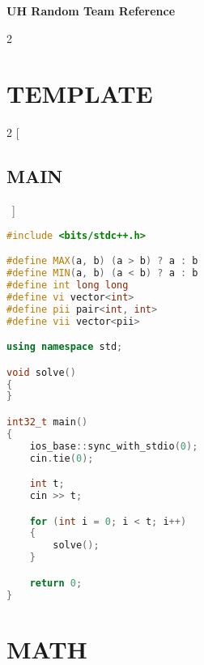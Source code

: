 \documentclass[leter]{amsart}
\begin{document}
\begin{center} \textbf{ UH Random Team Reference } \end{center} \vspace*{50pt} %

\begin{multicols}{2} \tableofcontents \end{multicols}

\enlargethispage*{\baselineskip} \pagebreak

\section{TEMPLATE}
\begin{multicols}{2}
[\subsection{MAIN}\ ]
\begin{lstlisting}[language=C++]
#include <bits/stdc++.h>

#define MAX(a, b) (a > b) ? a : b
#define MIN(a, b) (a < b) ? a : b
#define int long long
#define vi vector<int>
#define pii pair<int, int>
#define vii vector<pii>

using namespace std;

void solve()
{
}

int32_t main()
{
    ios_base::sync_with_stdio(0);
    cin.tie(0);

    int t;
    cin >> t;

    for (int i = 0; i < t; i++)
    {
        solve();
    }

    return 0;
}

\end{lstlisting}
\end{multicols}
\enlargethispage*{\baselineskip}\section{MATH}
\end{document}
